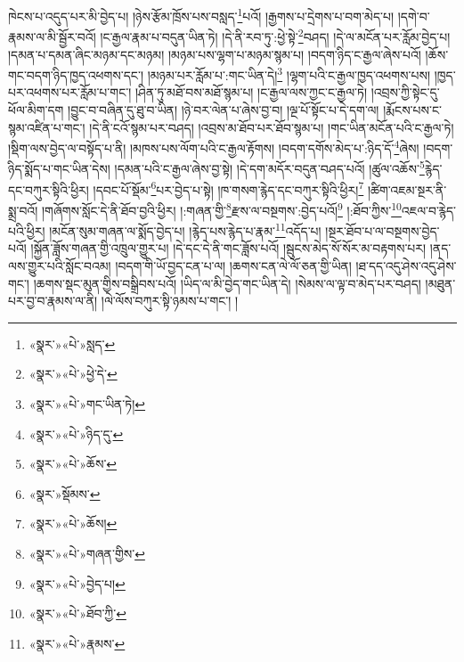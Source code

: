 ཁེངས་པ་འདུད་པར་མི་བྱེད་པ། །ཉེས་རྩོམ་ཁྲོས་པས་བསླད་\footnote{«སྣར་»«པེ་»སླད་}པའོ། །རྒྱགས་པ་དྲེགས་པ་བག་མེད་པ། །དགེ་བ་རྣམས་ལ་མི་སྦྱོར་བའོ། །ང་རྒྱལ་རྣམ་པ་བདུན་ཡིན་ཏེ། །དེ་ནི་རབ་ཏུ་:ཕྱེ་སྟེ་\footnote{«སྣར་»«པེ་»ཕྱེ་དེ་}བཤད། །དེ་ལ་མངོན་པར་རློམ་བྱེད་པ། །དམན་པ་དམན་ཞིང་མཉམ་དང་མཉམ། །མཉམ་པས་ལྷག་པ་མཉམ་སྙམ་པ། །བདག་ཉིད་ང་རྒྱལ་ཞེས་པའོ། །ཆོས་གང་བདག་ཉིད་ཁྱད་འཕགས་དང་། །མཉམ་པར་རློམ་པ་:གང་ཡིན་དེ།\footnote{«སྣར་»«པེ་»གང་ཡིན་ཏེ།} །ལྷག་པའི་ང་རྒྱལ་ཁྱད་འཕགས་པས། །ཁྱད་པར་འཕགས་པར་རློམ་པ་གང་། །ཤིན་ཏུ་མཐོ་བས་མཐོ་སྙམ་པ། །ང་རྒྱལ་ལས་ཀྱང་ང་རྒྱལ་ཏེ། །འབྲས་ཀྱི་སྟེང་དུ་ཕོལ་མིག་དག །བྱུང་བ་བཞིན་དུ་ཐུ་བ་ཡིན། །ཉེ་བར་ལེན་པ་ཞེས་བྱ་བ། །ལྔ་པོ་སྟོང་པ་དེ་དག་ལ། །རྨོངས་པས་ང་སྙམ་འཛིན་པ་གང་། །དེ་ནི་ངའོ་སྙམ་པར་བཤད། །འབྲས་མ་ཐོབ་པར་ཐོབ་སྙམ་པ། །གང་ཡིན་མངོན་པའི་ང་རྒྱལ་ཏེ། །སྡིག་ལས་བྱེད་ལ་བསྟོད་པ་ནི། །མཁས་པས་ལོག་པའི་ང་རྒྱལ་རྟོགས། །བདག་དགོས་མེད་པ་:ཉིད་དོ་\footnote{«སྣར་»«པེ་»ཉིད་དུ་}ཞེས། །བདག་ཉིད་སྨོད་པ་གང་ཡིན་དེས། །དམན་པའི་ང་རྒྱལ་ཞེས་བྱ་སྟེ། །དེ་དག་མདོར་བདུན་བཤད་པའོ། །ཚུལ་འཆོས་\footnote{«སྣར་»«པེ་»ཆོས་}རྙེད་དང་བཀུར་སྟིའི་ཕྱིར། །དབང་པོ་སྡོམ་\footnote{«སྣར་»སྡོམས་}པར་བྱེད་པ་སྟེ། །ཁ་གསག་རྙེད་དང་བཀུར་སྟིའི་ཕྱིར།\footnote{«སྣར་»«པེ་»ཆོས།} །ཚིག་འཇམ་སྔར་ནི་སྨྲ་བའོ། །གཞོགས་སློང་དེ་ནི་ཐོབ་བྱའི་ཕྱིར། །:གཞན་གྱི་\footnote{«སྣར་»«པེ་»གཞན་གྱིས་}རྫས་ལ་བསྔགས་:བྱེད་པའོ།\footnote{«སྣར་»«པེ་»བྱེད་པ།} །:ཐོབ་ཀྱིས་\footnote{«སྣར་»«པེ་»ཐོབ་ཀྱི་}འཇལ་བ་རྙེད་པའི་ཕྱིར། །མངོན་སུམ་གཞན་ལ་སྨོད་བྱེད་པ། །རྙེད་པས་རྙེད་པ་རྣམ་\footnote{«སྣར་»«པེ་»རྣམས་}འདོད་པ། །སྔར་ཐོབ་པ་ལ་བསྔགས་བྱེད་པའོ། །སྐྱོན་ཟློས་གཞན་གྱི་འཁྲུལ་གྱུར་པ། །དེ་དང་དེ་ནི་གང་ཟློས་པའོ། །སྦུངས་མེད་སོ་སོར་མ་བརྟགས་པར། །ནད་ལས་གྱུར་པའི་སློང་བའམ། །བདག་གི་ཡོ་བྱད་ངན་པ་ལ། །ཆགས་ངན་ལེ་ལོ་ཅན་གྱི་ཡིན། །ཐ་དད་འདུ་ཤེས་འདུ་ཤེས་གང་། །ཆགས་སྡང་མུན་གྱིས་བསྒྲིབས་པའོ། །ཡིད་ལ་མི་བྱེད་གང་ཡིན་དེ། །སེམས་ལ་ལྟ་བ་མེད་པར་བཤད། །མཐུན་པར་བྱ་བ་རྣམས་ལ་ནི། །ལེ་ལོས་བཀུར་སྟི་ཉམས་པ་གང་། །
